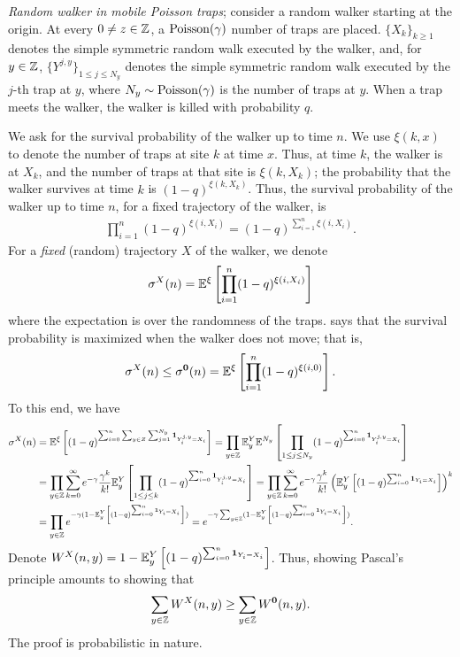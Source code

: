 \begin{example}
    \textit{Random walker in mobile Poisson traps}; consider a random walker starting at the origin. At every $0 \neq z \in \mathbb{Z}$, a $\operatorname{Poisson}(\gamma)$ number of traps are placed. $\{X_{k}\}_{k \geq 1}$ denotes the simple symmetric random walk executed by the walker, and, for $y \in \mathbb{Z}$, $\{Y^{j,y}\}_{1 \leq j \leq N_{y}}$ denotes the simple symmetric random walk executed by the $j$-th trap at $y$, where $N_{y} \sim \operatorname{Poisson}(\gamma)$ is the number of traps at $y$. When a trap meets the walker, the walker is killed with probability $q$.
\end{example}
We ask for the survival probability of the walker up to time $n$. We use $\xi(k,x)$ to denote the number of traps at site $k$ at time $x$. Thus, at time $k$, the walker is at $X_{k}$, and the number of traps at that site is $\xi(k,X_{k})$; the probability that the walker survives at time $k$ is $(1-q)^{\xi(k,X_{k})}$. Thus, the survival probability of the walker up to time $n$, for a fixed trajectory of the walker, is
\begin{align}
    \prod_{i=1}^{n} (1-q)^{\xi(i,X_{i})} = (1-q)^{\sum_{i=1}^{n} \xi(i,X_{i})}.
\end{align}
For a \textit{fixed} (random) trajectory $X$ of the walker, we denote
\begin{align}
    \sigma^{X}(n) = \mathbb{E}^{\xi}\left[ \prod_{i=1}^{n} (1-q)^{\xi(i,X_{i})} \right]
\end{align}
where the expectation is over the randomness of the traps.  says that the survival probability is maximized when the walker does not move; that is,
\begin{align}
    \sigma^{X}(n) \leq \sigma^{\mathbf{0}}(n) = \mathbb{E}^{\xi}\left[ \prod_{i=1}^{n} (1-q)^{\xi(i,0)} \right].
\end{align}
To this end, we have
\begin{align}
    \sigma^{X}(n) &= \mathbb{E}^{\xi}\left[ (1-q)^{\sum_{i=0}^{n}\sum_{y \in Z} \sum_{j=1}^{N_{y}} \textbf{1}_{Y_{i}^{j,y} = X_{i}}} \right] = \prod_{y \in \mathbb{Z}} \mathbb{E}^{Y}_{y} \mathbb{E}^{N_{y}} \left[ \prod_{1 \leq j \leq N_{y}} (1-q)^{\sum_{i=0}^{n} \textbf{1}_{Y_{i}^{j,y} = X_{i}}} \right] \notag \\
    &= \prod_{y \in \mathbb{Z}} \sum_{k=0}^{\infty} e^{-\gamma} \frac{\gamma^{k}}{k!} \mathbb{E}^{Y}_{y} \left[ \prod_{1 \leq j \leq k} (1-q)^{\sum_{i=0}^{n} \textbf{1}_{Y_{i}^{j,y} = X_{i}}} \right] = \prod_{y \in \mathbb{Z}} \sum_{k=0}^{\infty} e^{-\gamma} \frac{\gamma^{k}}{k!} \left( \mathbb{E}^{Y}_{y} \left[ (1-q)^{\sum_{i=0}^{n} \textbf{1}_{Y_{i} = X_{i}}} \right] \right)^{k} \notag \\
    &= \prod_{y \in \mathbb{Z}} e^{-\gamma (1 - \mathbb{E}^{Y}_{y} \left[ (1-q)^{\sum_{i=0}^{n} \textbf{1}_{Y_{i} = X_{i}}} \right])} = e^{-\gamma \sum_{y \in \mathbb{Z}} (1 - \mathbb{E}^{Y}_{y} \left[ (1-q)^{\sum_{i=0}^{n} \textbf{1}_{Y_{i} = X_{i}}} \right])}.
\end{align}
Denote $W^{X}(n,y) = 1 - \mathbb{E}^{Y}_{y} \left[ (1-q)^{\sum_{i=0}^{n} \textbf{1}_{Y_{i} = X_{i}}} \right]$. Thus, showing Pascal's principle amounts to showing that
\begin{align}
    \sum_{y \in \mathbb{Z}} W^{X}(n,y) \geq \sum_{y \in \mathbb{Z}} W^{\mathbf{0}}(n,y).
\end{align}
The proof is probabilistic in nature. 